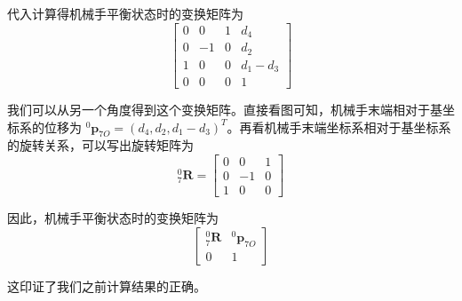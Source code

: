 \documentclass{homework}
\begin{document}
\begin{sol}
代入计算得机械手平衡状态时的变换矩阵为
\[
\begin{bmatrix}
    0 & 0 & 1 & d_4 \\
    0 & -1 & 0 & d_2 \\
    1 & 0 & 0 & d_1 - d_3 \\
    0 & 0 & 0 & 1
\end{bmatrix}
\]

我们可以从另一个角度得到这个变换矩阵。直接看图可知，机械手末端相对于基坐标系的位移为 $ ^0\mathbf{p}_{7O} = (d_4, d_2, d_1 - d_3)^T $。再看机械手末端坐标系相对于基坐标系的旋转关系，可以写出旋转矩阵为
\[
^0_7\mathbf{R} = 
\begin{bmatrix}
  0 & 0 & 1 \\
  0 & -1 & 0 \\
  1 & 0 & 0
\end{bmatrix}
\]

因此，机械手平衡状态时的变换矩阵为
\[
\begin{bmatrix}
  ^0_7\mathbf{R} & ^0\mathbf{p}_{7O} \\
  0 & 1
\end{bmatrix}
\]

这印证了我们之前计算结果的正确。

\end{sol}

\question
\end{document}
